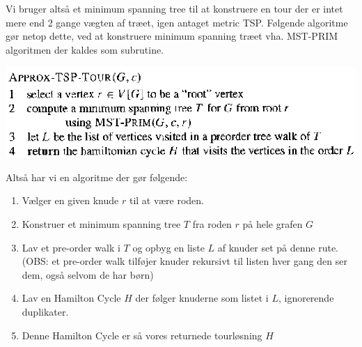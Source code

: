 Vi bruger altså et minimum spanning tree til at konstruere en tour der er intet mere end 2 gange vægten af træet, igen antaget metric TSP.
Følgende algoritme gør netop dette, ved at konstruere minimum spanning træet vha. MST-PRIM algoritmen der kaldes som subrutine.
\begin{center}
 \includegraphics[bb=0 0 754 196,scale=0.5]{img/approxTSPTour.png}
\end{center}
Altså har vi en algoritme der gør følgende:
\begin{enumerate}
 \item Vælger en given knude $r$ til at være roden.
 \item Konstruer et minimum spanning tree $T$ fra roden $r$ på hele grafen $G$
 \item Lav et pre-order walk i $T$ og opbyg en liste $L$ af knuder set på denne rute. (OBS: et pre-order walk tilføjer knuder rekursivt til listen hver gang den ser dem, også selvom de har børn)
 \item Lav en Hamilton Cycle $H$ der følger knuderne som listet i $L$, ignorerende duplikater.
 \item Denne Hamilton Cycle er så vores returnede tourløsning $H$
\end{enumerate}


